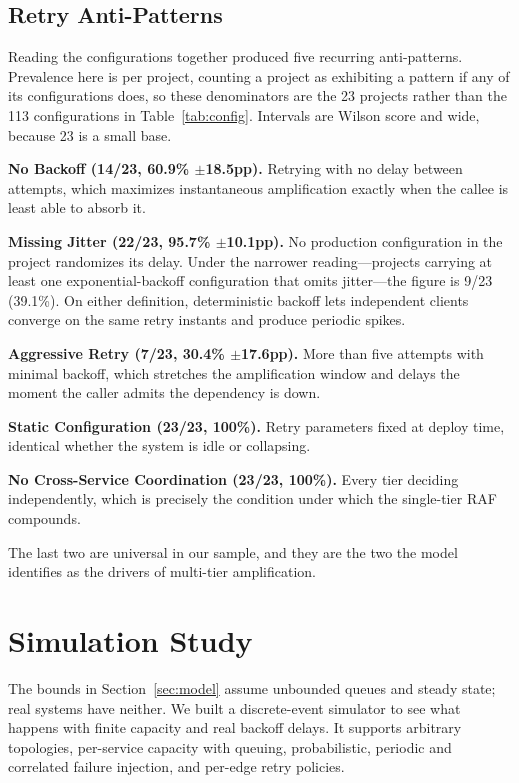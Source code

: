 \documentclass[conference]{IEEEtran}
\begin{document}
\subsection{Retry Anti-Patterns}
\label{sec:antipatterns}

Reading the configurations together produced five recurring anti-patterns. Prevalence here is per project, counting a project as exhibiting a pattern if any of its configurations does, so these denominators are the 23 projects rather than the 113 configurations in Table~\ref{tab:config}. Intervals are Wilson score and wide, because 23 is a small base.

\textbf{No Backoff (14/23, 60.9\% $\pm$18.5pp).} Retrying with no delay between attempts, which maximizes instantaneous amplification exactly when the callee is least able to absorb it.

\textbf{Missing Jitter (22/23, 95.7\% $\pm$10.1pp).} No production configuration in the project randomizes its delay. Under the narrower reading---projects carrying at least one exponential-backoff configuration that omits jitter---the figure is 9/23 (39.1\%). On either definition, deterministic backoff lets independent clients converge on the same retry instants and produce periodic spikes.

\textbf{Aggressive Retry (7/23, 30.4\% $\pm$17.6pp).} More than five attempts with minimal backoff, which stretches the amplification window and delays the moment the caller admits the dependency is down.

\textbf{Static Configuration (23/23, 100\%).} Retry parameters fixed at deploy time, identical whether the system is idle or collapsing.

\textbf{No Cross-Service Coordination (23/23, 100\%).} Every tier deciding independently, which is precisely the condition under which the single-tier RAF compounds.

The last two are universal in our sample, and they are the two the model identifies as the drivers of multi-tier amplification.

\section{Simulation Study}
\label{sec:simulation}

The bounds in Section~\ref{sec:model} assume unbounded queues and steady state; real systems have neither. We built a discrete-event simulator to see what happens with finite capacity and real backoff delays. It supports arbitrary topologies, per-service capacity with queuing, probabilistic, periodic and correlated failure injection, and per-edge retry policies.
\end{document}
